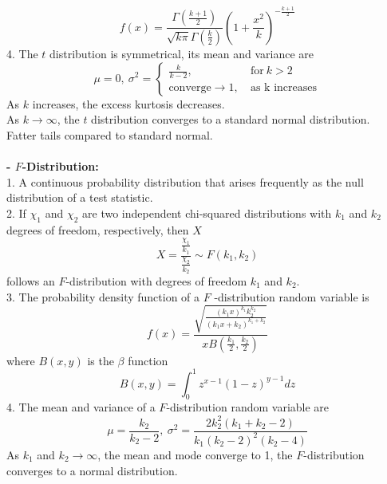\documentclass{article}
\begin{document}
\begin{enumerate}[S1 - ]
\begin{equation*}
    f(x) = \frac{\Gamma(\frac{k+1}{2})}{\sqrt{k\pi}\Gamma(\frac{k}{2})}(1+\frac{x^2}{k})^{-\frac{k+1}{2}}
    \end{equation*}
    4. The $t$ distribution is symmetrical, its mean and variance are
    \begin{equation*}
    \mu = 0, \ \sigma^2 = \left\{
    \begin{array}{cc}
    \frac{k}{k-2},& \ \text{for} \ k > 2\\
    \text{converge} \rightarrow 1,& \ \text{as k increases}
    \end{array}
    \right.
    \end{equation*}
    As $k$ increases, the excess kurtosis decreases.\\
    As $k \rightarrow \infty$, the $t$ distribution converges to a standard normal distribution.\\
    Fatter tails compared to standard normal.\\
    \\
    \textbf{- $F$-Distribution:}\\
    1. A continuous probability distribution that arises frequently as the null distribution of a test statistic.\\
    2. If $\chi_1$ and $\chi_2$ are two independent chi-squared distributions with $k_1$ and $k_2$ degrees of freedom, respectively, then $X$
    \begin{equation*}
    X = \frac{\frac{\chi_1}{k_1}}{\frac{\chi_2}{k_2}} \sim F(k_1,k_2)
    \end{equation*}
    follows an $F$-distribution with degrees of freedom $k_1$ and $k_2$.\\
    3. The probability density function of a $F$ -distribution random variable is
    \begin{equation*}
    f(x) = \frac{\sqrt{\frac{(k_{1}x)^{k_1}k_{2}^{k_2}}{(k_{1}x+k_{2})^{k_1+k_2}}}}{xB(\frac{k_1}{2},\frac{k_2}{2})}
    \end{equation*}
    where $B(x,y)$ is the $\beta$ function
    \begin{equation*}
    B(x,y) = \int_{0}^{1} z^{x-1}(1-z)^{y-1}dz
    \end{equation*}
    4. The mean and variance of a $F$-distribution random variable are
    \begin{equation*}
    \mu = \frac{k_2}{k_2-2}, \ \sigma^2 = \frac{2k_{2}^2(k_1+k_2-2)}{k_1(k_2-2)^2(k_2-4)}
    \end{equation*}
    As $k_1$ and $k_2 \to \infty$, the mean and mode converge to 1, the $F$-distribution converges to a normal distribution.\\
    

\end{enumerate}
\end{document}
